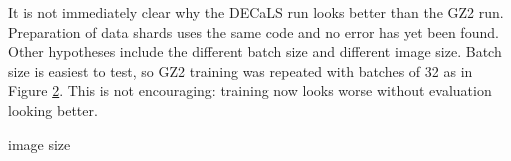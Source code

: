 \documentclass[twocolumn, twocolappendix, tighten]{aastex631}
\newcommand{\todo}{\color{red}{TODO}\color{black}\hspace{2mm}}
\begin{document}
It is not immediately clear why the DECaLS run looks better than the GZ2 run. Preparation of data shards uses the same code and no error has yet been found. Other hypotheses include the different batch size and different image size. Batch size is easiest to test, so GZ2 training was repeated with batches of 32 as in Figure \ref{fig:gz2_train_32}. This is not encouraging: training now looks worse without evaluation looking better.

\begin{figure}[htb!]
	\caption{
		\label{fig:decals_train}}
\end{figure}

\todo image size

\begin{figure}[htb!]
	\caption{
		\label{fig:gz2_train_32}}
\end{figure}


{}

\end{document}
